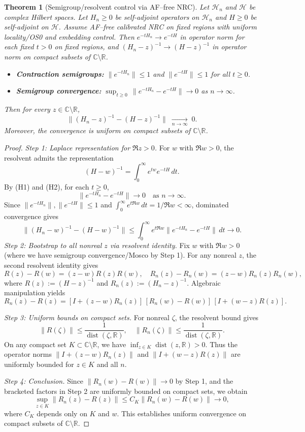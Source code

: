 \documentclass[11pt]{amsart}
\theoremstyle{plain}
\newtheorem{theorem}{Theorem}[section]
\theoremstyle{definition}
\theoremstyle{remark}
\begin{document}
\begin{theorem}[Semigroup/resolvent control via AF--free NRC]\label{thm:NRC-allz}
Let $\mathcal{H}_n$ and $\mathcal{H}$ be complex Hilbert spaces. Let $H_n\ge 0$ be self-adjoint operators on $\mathcal{H}_n$ and $H\ge 0$ be self-adjoint on $\mathcal{H}$. Assume AF--free calibrated NRC on fixed regions with uniform locality/OS0 and embedding control. Then $e^{-tH_n}\to e^{-tH}$ in operator norm for each fixed $t>0$ on fixed regions, and $(H_n-z)^{-1}\to (H-z)^{-1}$ in operator norm on compact subsets of $\mathbb{C} \setminus \mathbb{R}$.
\begin{itemize}
  \item[(H1)] \textbf{Contraction semigroups:} $\|e^{-tH_n}\| \le 1$ and $\|e^{-tH}\| \le 1$ for all $t \ge 0$.
  \item[(H2)] \textbf{Semigroup convergence:} $\sup_{t\ge 0}\,\|e^{-tH_n}-e^{-tH}\|\to 0$ as $n\to\infty$.
\end{itemize}
Then for every $z\in\mathbb C\setminus\mathbb R$,
\[
  \|(H_n-z)^{-1}-(H-z)^{-1}\|\;\xrightarrow[n\to\infty]{}\;0.
\]
Moreover, the convergence is uniform on compact subsets of $\mathbb{C} \setminus \mathbb{R}$.
\end{theorem}
\begin{proof}
\emph{Step 1: Laplace representation for $\Re z > 0$.} For $w$ with $\Re w > 0$, the resolvent admits the representation
\[
  (H-w)^{-1} = \int_0^\infty e^{tw} e^{-tH}\,dt.
\]
By (H1) and (H2), for each $t \ge 0$,
\[
  \|e^{-tH_n} - e^{-tH}\| \to 0 \quad \text{as } n \to \infty.
\]
Since $\|e^{-tH_n}\|, \|e^{-tH}\| \le 1$ and $\int_0^\infty e^{t\Re w}\,dt = 1/\Re w < \infty$, dominated convergence gives
\[
  \|(H_n-w)^{-1} - (H-w)^{-1}\| \le \int_0^\infty e^{t\Re w} \|e^{-tH_n} - e^{-tH}\|\,dt \to 0.
\]
\emph{Step 2: Bootstrap to all nonreal $z$ via resolvent identity.} Fix $w$ with $\Re w > 0$ (where we have semigroup convergence/Mosco by Step 1). For any nonreal $z$, the second resolvent identity gives
\[
  R(z) - R(w) = (z-w)R(z)R(w), \quad R_n(z) - R_n(w) = (z-w)R_n(z)R_n(w),
\]
where $R(z) := (H-z)^{-1}$ and $R_n(z) := (H_n-z)^{-1}$. Algebraic manipulation yields
\[
  R_n(z) - R(z) = [I + (z-w)R_n(z)]\,[R_n(w) - R(w)]\,[I + (w-z)R(z)].
\]

\emph{Step 3: Uniform bounds on compact sets.} For nonreal $\zeta$, the resolvent bound gives
\[
  \|R(\zeta)\| \le \frac{1}{\operatorname{dist}(\zeta,\mathbb{R})}, \quad \|R_n(\zeta)\| \le \frac{1}{\operatorname{dist}(\zeta,\mathbb{R})}.
\]
On any compact set $K \subset \mathbb{C} \setminus \mathbb{R}$, we have $\inf_{z \in K} \operatorname{dist}(z,\mathbb{R}) > 0$. Thus the operator norms $\|I + (z-w)R_n(z)\|$ and $\|I + (w-z)R(z)\|$ are uniformly bounded for $z \in K$ and all $n$.

\emph{Step 4: Conclusion.} Since $\|R_n(w) - R(w)\| \to 0$ by Step 1, and the bracketed factors in Step 2 are uniformly bounded on compact sets, we obtain
\[
  \sup_{z \in K} \|R_n(z) - R(z)\| \le C_K \|R_n(w) - R(w)\| \to 0,
\]
where $C_K$ depends only on $K$ and $w$. This establishes uniform convergence on compact subsets of $\mathbb{C} \setminus \mathbb{R}$.
\end{proof}
\end{document}
